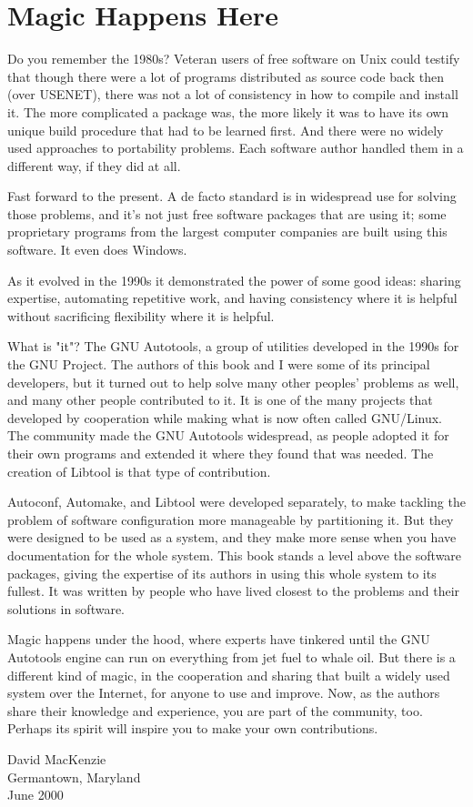 \chapter{Magic Happens Here}


Do you remember the 1980s? Veteran users of free software on Unix could testify that though there were a lot of programs distributed as source code back then (over USENET), there was not a lot of consistency in how to compile and install it. The more complicated a package was, the more likely it was to have its own unique build procedure that had to be learned first. And there were no widely used approaches to portability problems. Each software author handled them in a different way, if they did at all. 


Fast forward to the present. A de facto standard is in widespread use for solving those problems, and it's not just free software packages that are using it; some proprietary programs from the largest computer companies are built using this software. It even does Windows. 


As it evolved in the 1990s it demonstrated the power of some good ideas: sharing expertise, automating repetitive work, and having consistency where it is helpful without sacrificing flexibility where it is helpful. 


What is "it"? The GNU Autotools, a group of utilities developed in the 1990s for the GNU Project. The authors of this book and I were some of its principal developers, but it turned out to help solve many other peoples' problems as well, and many other people contributed to it. It is one of the many projects that developed by cooperation while making what is now often called GNU/Linux. The community made the GNU Autotools widespread, as people adopted it for their own programs and extended it where they found that was needed. The creation of Libtool is that type of contribution. 


Autoconf, Automake, and Libtool were developed separately, to make tackling the problem of software configuration more manageable by partitioning it. But they were designed to be used as a system, and they make more sense when you have documentation for the whole system. This book stands a level above the software packages, giving the expertise of its authors in using this whole system to its fullest. It was written by people who have lived closest to the problems and their solutions in software. 


Magic happens under the hood, where experts have tinkered until the GNU Autotools engine can run on everything from jet fuel to whale oil. But there is a different kind of magic, in the cooperation and sharing that built a widely used system over the Internet, for anyone to use and improve. Now, as the authors share their knowledge and experience, you are part of the community, too. Perhaps its spirit will inspire you to make your own contributions. 

\bigskip
\bigskip
\noindent
David MacKenzie\\
Germantown, Maryland\\
June 2000 




